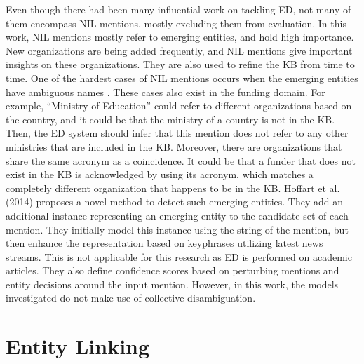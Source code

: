 \documentclass{report}
\theoremstyle{definition}
\theoremstyle{remark}
\begin{document}
Even though there had been many influential work on tackling ED, not many of them encompass NIL mentions, mostly excluding them from evaluation. In this work, NIL mentions mostly refer to emerging entities, and hold high importance. New organizations are being added frequently, and NIL mentions give important insights on these organizations. They are also used to refine the KB from time to time. One of the hardest cases of NIL mentions occurs when the emerging entities have ambiguous names \cite{NILMentions}. These cases also exist in the funding domain. For example, ``Ministry of Education'' could refer to different organizations based on the country, and it could be that the ministry of a country is not in the KB. Then, the ED system should infer that this mention does not refer to any other ministries that are included in the KB. Moreover, there are organizations that share the same acronym as a coincidence. It could be that a funder that does not exist in the KB is acknowledged by using its acronym, which matches a completely different organization that happens to be in the KB. Hoffart et al. (2014) \cite{NILMentions} proposes a novel method to detect such emerging entities. They add an additional instance representing an emerging entity to the candidate set of each mention. They initially model this instance using the string of the mention, but then enhance the representation based on keyphrases utilizing latest news streams. This is not applicable for this research as ED is performed on academic articles. They also define confidence scores based on perturbing mentions and entity decisions around the input mention. However, in this work, the models investigated do not make use of collective disambiguation.

\section{Entity Linking}
\label{sota3}
\end{document}
